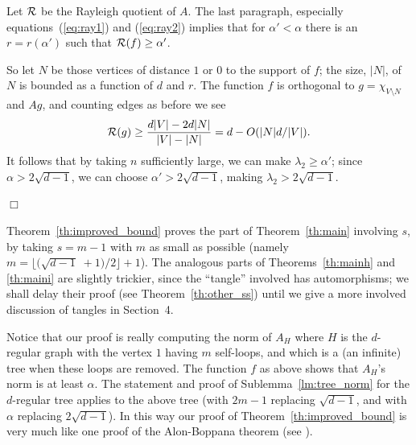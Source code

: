 \documentclass[12pt]{article}
\newcommand{\proofbox}{\begin{flushright}$\Box$\end{flushright}}
\begin{document}
Let ${\cal R}$ be the Rayleigh quotient of $A$.
The last paragraph, especially equations~(\ref{eq:ray1}) and 
(\ref{eq:ray2}) implies that
for $\alpha'<\alpha$ there is an $r=r(\alpha')$ such that
${\cal R}(f)\ge \alpha'$.

So let $N$ be those vertices of distance $1$ or $0$ to
the support of $f$; the size, $|N|$, of $N$ is bounded as a function of 
$d$ and $r$.
The function $f$ is
orthogonal to $g=\chi_{V\setminus N}$ and $Ag$, 
and counting edges as before we see
$$
{\cal R}(g)\ge \frac{d|V|-2d|N|}{|V|-|N|}= d - O(|N|d/|V|).
$$
It follows that by taking $n$ sufficiently large, we can
make $\lambda_2\ge \alpha'$;  since $\alpha>2\sqrt{d-1}$, we can choose
$\alpha'>2\sqrt{d-1}$, making
$\lambda_2>2\sqrt{d-1}$.
\proofbox

Theorem~\ref{th:improved_bound} proves the part of Theorem~\ref{th:main}
involving $s$, by taking $s=m-1$ with $m$ as small as possible
(namely $m=\lfloor \bigl(\sqrt{d-1}\;+1\bigr)/2
\rfloor+1$).
The analogous parts of Theorems~\ref{th:mainh} and \ref{th:maini}
are slightly trickier, since the ``tangle'' involved has automorphisms;
we shall delay their proof (see Theorem~\ref{th:other_ss})
until we give a more involved discussion of
tangles in Section~4.

Notice that our proof is really computing the norm of $A_H$ where $H$ is
the $d$-regular graph with the vertex $1$ having $m$ self-loops, and which
is a (an infinite) tree when these loops are removed.  The function
$f$ as above
shows that $A_H$'s norm is at least $\alpha$.
The statement and proof of Sublemma~\ref{lm:tree_norm}
for the $d$-regular tree applies to the
above tree (with $2m-1$ replacing $\sqrt{d-1}$, and with $\alpha$
replacing $2\sqrt{d-1}$).
In this way our proof of Theorem~\ref{th:improved_bound}
is very much like one proof of
the Alon-Boppana theorem (see \cite{nilli,friedman_geometric_aspects}).
\end{document}
